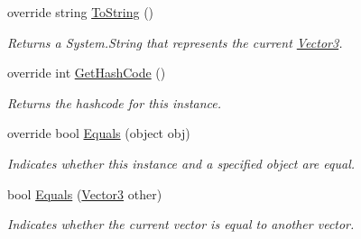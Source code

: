 \begin{DoxyCompactItemize}
override string \hyperlink{struct_open_t_k_1_1_vector3_ab26de735b2646eb8c9f289fc99684f18}{To\-String} ()
\begin{DoxyCompactList}\small\item\em Returns a System.\-String that represents the current \hyperlink{struct_open_t_k_1_1_vector3}{Vector3}. \end{DoxyCompactList}\item 
override int \hyperlink{struct_open_t_k_1_1_vector3_afc81bc318b2f253603561d1d6845dfb4}{Get\-Hash\-Code} ()
\begin{DoxyCompactList}\small\item\em Returns the hashcode for this instance. \end{DoxyCompactList}\item 
override bool \hyperlink{struct_open_t_k_1_1_vector3_a142ab6d16736a913b72c629d49a4d17f}{Equals} (object obj)
\begin{DoxyCompactList}\small\item\em Indicates whether this instance and a specified object are equal. \end{DoxyCompactList}\item 
bool \hyperlink{struct_open_t_k_1_1_vector3_a2faf32fa979f2e9393d0e51beb80f147}{Equals} (\hyperlink{struct_open_t_k_1_1_vector3}{Vector3} other)
\begin{DoxyCompactList}\small\item\em Indicates whether the current vector is equal to another vector.\end{DoxyCompactList}\end{DoxyCompactItemize}
